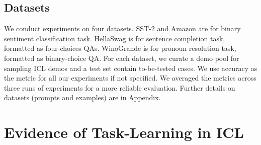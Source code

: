 \documentclass[11pt]{article}
\newcommand{\fzx}[1]{\textbf{\color{blue}[{\bf Zhouxiang}: #1]}}
\newcommand{\daniel}[1]{{\color{purple}[{\bf DK}: #1]}}
\newcommand{\aayush}[1]{{\color{green}[{\bf Aayush}: #1]}}
\begin{document}
\subsection{Datasets}

\label{subsec:datasets}
We conduct experiments on four datasets.
SST-2 \cite{socher2013recursive} and Amazon \citep[Amazon Reviews 2023]{hou2024bridging} are for binary sentiment classification task.
HellaSwag \cite{zellers2019hellaswag} is for sentence completion task, formatted as four-choices QAs.
WinoGrande \cite{sakaguchi2020winogrande} is for pronoun resolution task, formatted as binary-choice QA.
For each dataset, we curate a demo pool for sampling ICL demos and a test set contain to-be-tested cases.
We use accuracy as the metric for all our experiments if not specified.
We averaged the metrics across three runs of experiments for a more reliable evaluation.
Further details on datasets (prompts and examples) are in Appendix.




\section{Evidence of Task-Learning in ICL}
\label{results:llm:solve:it}
\label{results}
\end{document}
